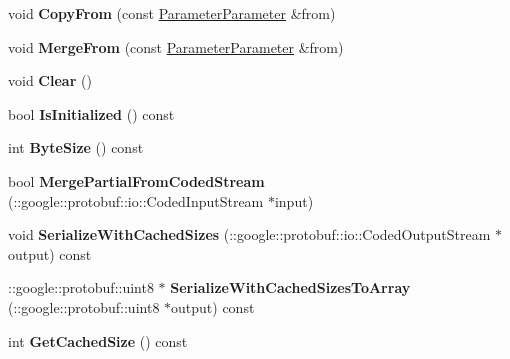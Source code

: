 \begin{DoxyCompactItemize}
void {\bfseries Copy\+From} (const \mbox{\hyperlink{classcaffe_1_1_parameter_parameter}{Parameter\+Parameter}} \&from)
\item 
\mbox{\label{classcaffe_1_1_parameter_parameter_acfbc6995768402253f9ac576bfd22616}} 
void {\bfseries Merge\+From} (const \mbox{\hyperlink{classcaffe_1_1_parameter_parameter}{Parameter\+Parameter}} \&from)
\item 
\mbox{\label{classcaffe_1_1_parameter_parameter_ac9db57f67ba93d7515a731d9c27f84cc}} 
void {\bfseries Clear} ()
\item 
\mbox{\label{classcaffe_1_1_parameter_parameter_a946255f3442bc9e33b5095049608b40a}} 
bool {\bfseries Is\+Initialized} () const
\item 
\mbox{\label{classcaffe_1_1_parameter_parameter_afb1400b9e82d3495473f1f1866094bff}} 
int {\bfseries Byte\+Size} () const
\item 
\mbox{\label{classcaffe_1_1_parameter_parameter_a4db8abc2f2bb1f62912119fb7cbedaca}} 
bool {\bfseries Merge\+Partial\+From\+Coded\+Stream} (\+::google\+::protobuf\+::io\+::\+Coded\+Input\+Stream $\ast$input)
\item 
\mbox{\label{classcaffe_1_1_parameter_parameter_aa130aaa50c910728c298543623359b55}} 
void {\bfseries Serialize\+With\+Cached\+Sizes} (\+::google\+::protobuf\+::io\+::\+Coded\+Output\+Stream $\ast$output) const
\item 
\mbox{\label{classcaffe_1_1_parameter_parameter_a44bb851ced3e0895ae4f9fb3dc4fde7e}} 
\+::google\+::protobuf\+::uint8 $\ast$ {\bfseries Serialize\+With\+Cached\+Sizes\+To\+Array} (\+::google\+::protobuf\+::uint8 $\ast$output) const
\item 
\mbox{\label{classcaffe_1_1_parameter_parameter_a229083906b793f3216772690cb008180}} 
int {\bfseries Get\+Cached\+Size} () const
\item 
\mbox{\label{classcaffe_1_1_parameter_parameter_a31a3b61ae9df4e65668f6527f9c102bc}} 

\end{DoxyCompactItemize}
